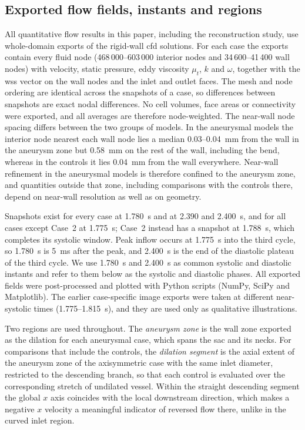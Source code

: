 \documentclass[12pt,a4paper]{article}
\newcommand{\CFD}{\ac{cfd}\xspace}
\newcommand{\WSS}{\ac{wss}\xspace}
\theoremstyle{definition}
\numberwithin{equation}{section}
\begin{document}
\subsection{Exported flow fields, instants and regions}
\label{sec:exports}
All quantitative flow results in this paper, including the reconstruction study, use whole-domain exports of the rigid-wall \CFD solutions. For each case the exports contain every fluid node (468\,000--603\,000 interior nodes and 34\,600--41\,400 wall nodes) with velocity, static pressure, eddy viscosity $\mu_t$, $k$ and $\omega$, together with the \WSS vector on the wall nodes and the inlet and outlet faces. The mesh and node ordering are identical across the snapshots of a case, so differences between snapshots are exact nodal differences. No cell volumes, face areas or connectivity were exported, and all averages are therefore node-weighted. The near-wall node spacing differs between the two groups of models. In the aneurysmal models the interior node nearest each wall node lies a median 0.03--0.04~mm from the wall in the aneurysm zone but 0.58~mm on the rest of the wall, including the bend, whereas in the controls it lies 0.04~mm from the wall everywhere. Near-wall refinement in the aneurysmal models is therefore confined to the aneurysm zone, and quantities outside that zone, including comparisons with the controls there, depend on near-wall resolution as well as on geometry.

Snapshots exist for every case at 1.780~s and at 2.390 and 2.400~s, and for all cases except Case~2 at 1.775~s; Case~2 instead has a snapshot at 1.788~s, which completes its systolic window. Peak inflow occurs at 1.775~s into the third cycle, so 1.780~s is 5~ms after the peak, and 2.400~s is the end of the diastolic plateau of the third cycle. We use 1.780~s and 2.400~s as common systolic and diastolic instants and refer to them below as the systolic and diastolic phases. All exported fields were post-processed and plotted with Python scripts (NumPy, SciPy and Matplotlib). The earlier case-specific image exports were taken at different near-systolic times (1.775--1.815~s), and they are used only as qualitative illustrations.

Two regions are used throughout. The \emph{aneurysm zone} is the wall zone exported as the dilation for each aneurysmal case, which spans the sac and its necks. For comparisons that include the controls, the \emph{dilation segment} is the axial extent of the aneurysm zone of the axisymmetric case with the same inlet diameter, restricted to the descending branch, so that each control is evaluated over the corresponding stretch of undilated vessel. Within the straight descending segment the global $x$ axis coincides with the local downstream direction, which makes a negative $x$ velocity a meaningful indicator of reversed flow there, unlike in the curved inlet region.
\end{document}

